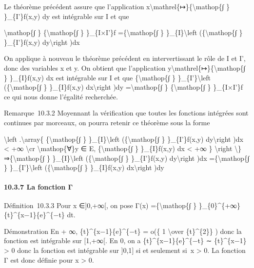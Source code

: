 \documentclass[]{article}
\begin{document}
Le théorème précédent assure que l'application
x\textbackslash{}mathrel\{↦\}\{\textbackslash{}mathop\{∫ \}
\}\_\{I'\}f(x,y) dy est intégrable sur I et que

\textbackslash{}mathop\{∫ \} \{\textbackslash{}mathop\{∫ \}
\}\_\{I×I'\}f =\{\textbackslash{}mathop\{∫ \}
\}\_\{I\}\textbackslash{}left (\{\textbackslash{}mathop\{∫ \}
\}\_\{I'\}f(x,y) dy\textbackslash{}right )dx

On applique à nouveau le théorème précédent en intervertissant le rôle
de I et I', donc des variables x et y. On obtient que l'application
y\textbackslash{}mathrel\{↦\}\{\textbackslash{}mathop\{∫ \}
\}\_\{I\}f(x,y) dx est intégrable sur I et que
\{\textbackslash{}mathop\{∫ \} \}\_\{I'\}\textbackslash{}left
(\{\textbackslash{}mathop\{∫ \} \}\_\{I\}f(x,y) dx\textbackslash{}right
)dy =\textbackslash{}mathop\{∫ \} \{\textbackslash{}mathop\{∫ \}
\}\_\{I×I'\}f ce qui nous donne l'égalité recherchée.

Remarque~10.3.2 Moyennant la vérification que toutes les fonctions
intégrées sont continues par morceaux, on pourra retenir ce théorème
sous la forme

\textbackslash{}left .\textbackslash{}array\{
\{\textbackslash{}mathop\{∫ \} \}\_\{I\}\textbackslash{}left
(\{\textbackslash{}mathop\{∫ \} \}\_\{I'\}\textbar{}f(x,y)\textbar{}
dy\textbackslash{}right )dx \textless{} +∞ \textbackslash{}cr
\textbackslash{}mathop\{∀\}y ∈ E, \{\textbackslash{}mathop\{∫ \}
\}\_\{I\}\textbar{}f(x,y)\textbar{} dx \textless{} +∞ \}
\textbackslash{}right \textbackslash{}\}⇒\{\textbackslash{}mathop\{∫ \}
\}\_\{I\}\textbackslash{}left (\{\textbackslash{}mathop\{∫ \}
\}\_\{I'\}f(x,y) dy\textbackslash{}right )dx
=\{\textbackslash{}mathop\{∫ \} \}\_\{I'\}\textbackslash{}left
(\{\textbackslash{}mathop\{∫ \} \}\_\{I\}f(x,y) dx\textbackslash{}right
)dy

\paragraph{10.3.7 La fonction Γ}

Définition~10.3.3 Pour x ∈{]}0,+∞{[}, on pose Γ(x)
=\{\textbackslash{}mathop\{∫ \}
\}\_\{0\}\^{}\{+∞\}\{t\}\^{}\{x−1\}\{e\}\^{}\{−t\} dt.

Démonstration En + ∞, \{t\}\^{}\{x−1\}\{e\}\^{}\{−t\} = o(\{ 1
\textbackslash{}over \{t\}\^{}\{2\}\} ) donc la fonction est intégrable
sur {[}1,+∞{[}. En 0, on a \{t\}\^{}\{x−1\}\{e\}\^{}\{−t\} ∼
\{t\}\^{}\{x−1\} \textgreater{} 0 donc la fonction est intégrable sur
{]}0,1{]} si et seulement si~x \textgreater{} 0. La fonction Γ est donc
définie pour x \textgreater{} 0.
\end{document}
